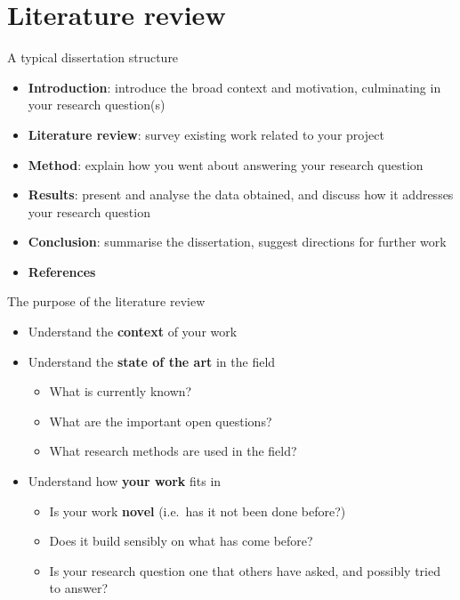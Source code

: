 \part{Literature review}
\frame{\partpage}

\begin{frame}{A typical dissertation structure}
	\begin{itemize}
		\pause\item \textbf{Introduction}: introduce the broad context and motivation,
			culminating in your research question(s)
		\pause\item \textbf{Literature review}: survey existing work related to your project
		\pause\item \textbf{Method}: explain how you went about answering your research question
		\pause\item \textbf{Results}: present and analyse the data obtained, and discuss how it addresses
			your research question
		\pause\item \textbf{Conclusion}: summarise the dissertation, suggest directions for further work
		\pause\item \textbf{References}
	\end{itemize}
\end{frame}

\begin{frame}{The purpose of the literature review}
	\begin{itemize}
		\pause\item Understand the \textbf{context} of your work
		\pause\item Understand the \textbf{state of the art} in the field
			\begin{itemize}
				\pause\item What is currently known?
				\pause\item What are the important open questions?
				\pause\item What research methods are used in the field?
			\end{itemize}
		\pause\item Understand how \textbf{your work} fits in
			\begin{itemize}
				\pause\item Is your work \textbf{novel} (i.e.\ has it not been done before?)
				\pause\item Does it build sensibly on what has come before?
				\pause\item Is your research question one that others have asked, and possibly tried to answer?
			\end{itemize}
	\end{itemize}
\end{frame}

